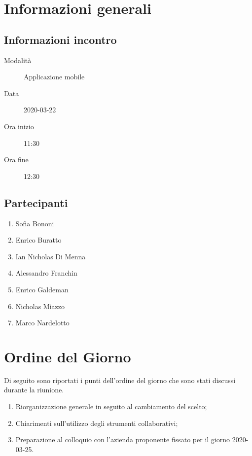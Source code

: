 \documentclass{article}
\begin{document}


\section{Informazioni generali}%
\label{sec:informazioni_generali}

\subsection{Informazioni incontro}%
\label{sub:informazioni_incontro}

\begin{description}
  \item[Modalità] Applicazione mobile 
  \item[Data] 2020-03-22
  \item[Ora inizio] 11:30
  \item[Ora fine] 12:30
\end{description}

\subsection{Partecipanti}%
\label{sub:partecipanti}

\begin{enumerate}
  \item Sofia Bononi
  \item Enrico Buratto
  \item Ian Nicholas Di Menna
  \item Alessandro Franchin
  \item Enrico Galdeman
  \item Nicholas Miazzo
  \item Marco Nardelotto
\end{enumerate}

\section{Ordine del Giorno}%
\label{ordine_del_giorno}
Di seguito sono riportati i punti dell'ordine del giorno che sono stati discussi durante la riunione.
\begin{enumerate}
  \item Riorganizzazione generale in seguito al cambiamento del  scelto;
  \item Chiarimenti sull'utilizzo degli strumenti collaborativi;
  \item Preparazione al colloquio con l'azienda proponente fissato per il giorno 2020-03-25.
\end{enumerate}
\end{document}
